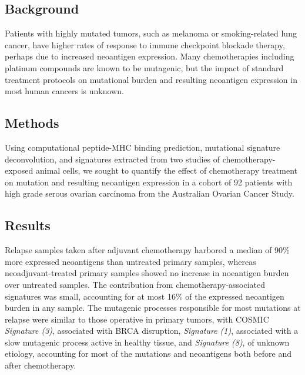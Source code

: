 \subsection*{Background}
Patients with highly mutated tumors, such as melanoma or smoking-related lung cancer, have higher rates of response to immune checkpoint blockade therapy, perhaps due to increased neoantigen expression. Many chemotherapies including platinum compounds are known to be mutagenic, but the impact of standard treatment protocols on mutational burden and resulting neoantigen expression in most human cancers is unknown.


\subsection*{Methods}

Using computational peptide-MHC binding prediction, mutational signature deconvolution, and signatures extracted from two studies of chemotherapy-exposed animal cells, we sought to quantify the effect of chemotherapy treatment on mutation and resulting neoantigen expression in a cohort of 92 patients with high grade serous ovarian carcinoma from the Australian Ovarian Cancer Study.


\subsection*{Results}
Relapse samples taken after adjuvant chemotherapy harbored a median of 90\% more expressed neoantigens than untreated primary samples, whereas neoadjuvant-treated primary samples showed no increase in noeantigen burden over untreated samples. The contribution from chemotherapy-associated signatures was small, accounting for at most 16\% of the expressed neoantigen burden in any sample. The mutagenic processes responsible for most mutations at relapse were similar to those operative in primary tumors, with COSMIC \textit{Signature (3)}, associated with BRCA disruption, \textit{Signature (1)}, associated with a slow mutagenic process active in healthy tissue, and \textit{Signature (8)}, of unknown etiology, accounting for most of the mutations and neoantigens both before and after chemotherapy.

